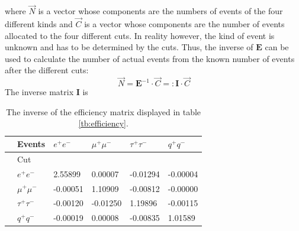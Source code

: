 where $\vec{N}$ is a vector whose components are the numbers of events of the four different kinds and $\vec{C}$ is a vector whose components are the number of events allocated to the four different cuts. 
In reality however, the kind of event is unknown and has to be determined by the cuts. Thus, the inverse of $\boldsymbol{E}$ can be used to calculate the number of actual events from the known number of events after the different cuts:
\begin{equation}
\vec{N}=\boldsymbol{E}^{-1}\cdot\vec{C}=:\boldsymbol{I}\cdot\vec{C}
\label{eq:numberevents}
\end{equation} 
The inverse matrix $\boldsymbol{I}$ is
\begin{table}[H]\centering
	\begin{tabular}{@{}llllll@{}}
		\toprule
		&Events &$e^+e^-$&$\mu^+\mu^-$&$\tau^+\tau^-$&$q^+q^-$\\
		\midrule
		&Cut&&&&\\
		&$e^+e^-$&2.55899&0.00007&-0.01294&-0.00004\\
		&$\mu^+\mu^-$&-0.00051&1.10909&-0.00812&-0.00000\\
		&$\tau^+\tau^-$&-0.00120&-0.01250&1.19896&-0.00115\\
		&$q^+q^-$&-0.00019&0.00008&-0.00835&1.01589\\
		\bottomrule
	\end{tabular}
	\caption[Inverse efficiency matrix]{The inverse of the efficiency matrix displayed in table \ref{tb:efficiency}.}
	\label{tb:invefficiency}
\end{table}

